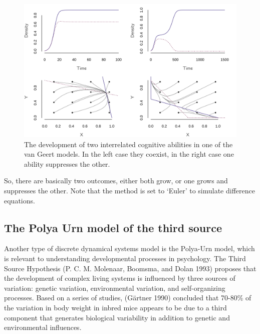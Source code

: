\documentclass[
  a4paper,
  DIV=11,
  numbers=noendperiod]{scrreprt}
\begin{document}
\begin{figure}

{\centering \includegraphics{media/ch4n/fig-ch4n-img11-old-59.png}

}

\caption{\label{fig-ch4n-img11-old-59}The development of two
interrelated cognitive abilities in one of the van Geert models. In the
left case they coexist, in the right case one ability suppresses the
other.}

\end{figure}

So, there are basically two outcomes, either both grow, or one grows and
suppresses the other. Note that the method is set to `Euler' to simulate
difference equations.

\hypertarget{sec-The-Polya-Urn-model-of-the-third-source}{%
\subsection{The Polya Urn model of the third
source}\label{sec-The-Polya-Urn-model-of-the-third-source}}

Another type of discrete dynamical systems model is the Polya-Urn model,
which is relevant to understanding developmental processes in
psychology. The Third Source Hypothesis (P. C. M. Molenaar, Boomsma, and
Dolan 1993) proposes that the development of complex living systems is
influenced by three sources of variation: genetic variation,
environmental variation, and self-organizing processes. Based on a
series of studies, (Gärtner 1990) concluded that 70-80\% of the
variation in body weight in inbred mice appears to be due to a third
component that generates biological variability in addition to genetic
and environmental influences.
\end{document}
